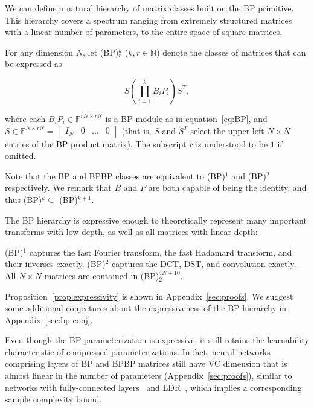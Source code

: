 We can define a natural hierarchy of matrix classes built on the BP primitive. This hierarchy covers a spectrum ranging from extremely structured matrices with a linear number of parameters, to the entire space of square matrices.

\begin{definition}
  For any dimension $N$, let (BP)$^{k}_r$ ($k, r \in \mathbb{N}$) denote the classes of matrices that can be expressed as
  \label{def:bp-hierarchy}

    \[
      S \left( \prod_{i=1}^k B_{i}P_i \right) S^T,
    \]

  where each $B_iP_i \in \mathbb{F}^{rN \times rN}$ is a BP module as in equation~\eqref{eq:BP},
  and $S \in \mathbb{F}^{N \times rN} = \begin{bmatrix} I_N & 0 & \hdots & 0 \end{bmatrix}$ (that is, $S$ and $S^T$ select the upper left $N \times N$ entries of the BP product matrix). The subscript $r$ is understood to be $1$ if omitted.
\end{definition}

Note that the BP and BPBP classes are equivalent to (BP)$^1$ and (BP)$^2$ respectively. We remark that $B$ and $P$ are both capable of being the identity, and thus (BP)$^k \subseteq$ (BP)$^{k+1}$.

The BP hierarchy is expressive enough to theoretically represent many important transforms with low depth, as well as all matrices with linear depth:

\begin{proposition}
  \label{prop:expressivity}
  (BP)$^1$ captures the fast Fourier transform, the fast Hadamard transform, and their inverses exactly. (BP)$^2$ captures the DCT, DST, and convolution exactly. All $N \times N$ matrices are contained in (BP)$^{4N+10}_2$.
\end{proposition}

Proposition~\ref{prop:expressivity} is shown in Appendix~\ref{sec:proofs}.
We suggest some additional conjectures about the expressiveness of the BP hierarchy in Appendix~\ref{sec:bp-conj}.

Even though the BP parameterization is expressive, it still retains the learnability characteristic of compressed parameterizations. In fact, neural networks comprising layers of BP and BPBP matrices still have VC dimension that is almost linear in the number of parameters
(Appendix~\ref{sec:proofs}), similar to networks with fully-connected layers~\citep{bartlett1999almost,bartlett2017nearly} and LDR~\cite{thomas2018learning}, which implies a corresponding sample complexity bound.

